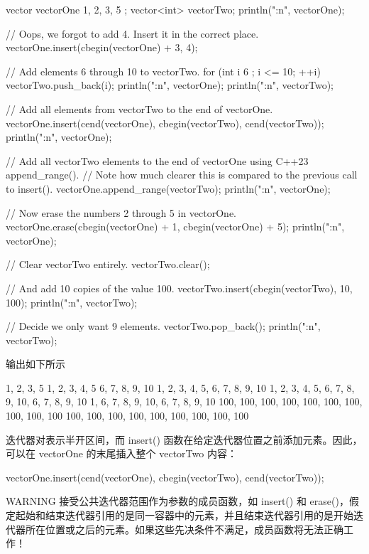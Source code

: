 \begin{cpp}
vector vectorOne { 1, 2, 3, 5 };
vector<int> vectorTwo;
println("{:n}", vectorOne);

// Oops, we forgot to add 4. Insert it in the correct place.
vectorOne.insert(cbegin(vectorOne) + 3, 4);

// Add elements 6 through 10 to vectorTwo.
for (int i { 6 }; i <= 10; ++i) {
    vectorTwo.push_back(i);
}
println("{:n}", vectorOne);
println("{:n}", vectorTwo);

// Add all elements from vectorTwo to the end of vectorOne.
vectorOne.insert(cend(vectorOne), cbegin(vectorTwo), cend(vectorTwo));
println("{:n}", vectorOne);

// Add all vectorTwo elements to the end of vectorOne using C++23 append_range().
// Note how much clearer this is compared to the previous call to insert().
vectorOne.append_range(vectorTwo);
println("{:n}", vectorOne);

// Now erase the numbers 2 through 5 in vectorOne.
vectorOne.erase(cbegin(vectorOne) + 1, cbegin(vectorOne) + 5);
println("{:n}", vectorOne);

// Clear vectorTwo entirely.
vectorTwo.clear();

// And add 10 copies of the value 100.
vectorTwo.insert(cbegin(vectorTwo), 10, 100);
println("{:n}", vectorTwo);

// Decide we only want 9 elements.
vectorTwo.pop_back();
println("{:n}", vectorTwo);
\end{cpp}

输出如下所示

\begin{shell}
1, 2, 3, 5
1, 2, 3, 4, 5
6, 7, 8, 9, 10
1, 2, 3, 4, 5, 6, 7, 8, 9, 10
1, 2, 3, 4, 5, 6, 7, 8, 9, 10, 6, 7, 8, 9, 10
1, 6, 7, 8, 9, 10, 6, 7, 8, 9, 10
100, 100, 100, 100, 100, 100, 100, 100, 100, 100
100, 100, 100, 100, 100, 100, 100, 100, 100
\end{shell}

迭代器对表示半开区间，而 insert() 函数在给定迭代器位置之前添加元素。因此，可以在 vectorOne 的末尾插入整个 vectorTwo 内容：

\begin{cpp}
vectorOne.insert(cend(vectorOne), cbegin(vectorTwo), cend(vectorTwo));
\end{cpp}

\begin{myWarning}{WARNING}
接受公共迭代器范围作为参数的成员函数，如 insert() 和 erase()，假定起始和结束迭代器引用的是同一容器中的元素，并且结束迭代器引用的是开始迭代器所在位置或之后的元素。如果这些先决条件不满足，成员函数将无法正确工作！
\end{myWarning}

